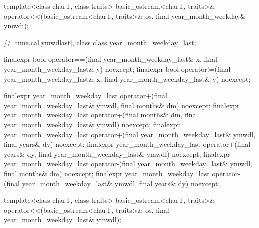 \begin{codeblock}
{{    template<class charT, class traits>
      basic_ostream<charT, traits>&
        operator<<(basic_ostream<charT, traits>& os, final year_month_weekday& ymwdi);

    // \ref{time.cal.ymwdlast}, class 
    class year_month_weekday_last;

    finalexpr bool operator==(final year_month_weekday_last& x,
                              final year_month_weekday_last& y) noexcept;
    finalexpr bool operator!=(final year_month_weekday_last& x,
                              final year_month_weekday_last& y) noexcept;

    finalexpr year_month_weekday_last
      operator+(final year_month_weekday_last& ymwdl, final months& dm) noexcept;
    finalexpr year_month_weekday_last
      operator+(final months& dm, final year_month_weekday_last& ymwdl) noexcept;
    finalexpr year_month_weekday_last
      operator+(final year_month_weekday_last& ymwdl, final years& dy) noexcept;
    finalexpr year_month_weekday_last
      operator+(final years& dy, final year_month_weekday_last& ymwdl) noexcept;
    finalexpr year_month_weekday_last
      operator-(final year_month_weekday_last& ymwdl, final months& dm) noexcept;
    finalexpr year_month_weekday_last
      operator-(final year_month_weekday_last& ymwdl, final years& dy) noexcept;

    template<class charT, class traits>
      basic_ostream<charT, traits>&
        operator<<(basic_ostream<charT, traits>& os, final year_month_weekday_last& ymwdl);

}}
\end{codeblock}
